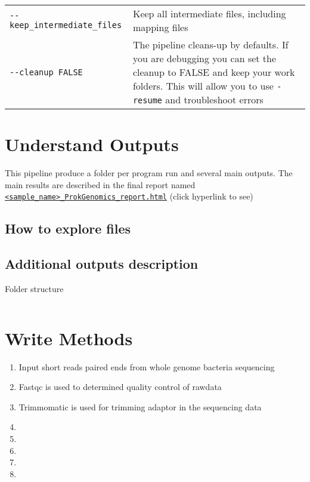 \documentclass[
]{book}
\providecommand{\tightlist}{%
  \setlength{\itemsep}{0pt}\setlength{\parskip}{0pt}}
\begin{document}
\begin{longtable}[]{@{}
  >{\raggedright\arraybackslash}p{}
  >{\raggedright\arraybackslash}p{}@{}}
\texttt{-\/-keep\_intermediate\_files} & Keep all intermediate files, including mapping files \\
\texttt{-\/-cleanup\ FALSE} & The pipeline cleans-up by defaults. If you are debugging you can set the cleanup to FALSE and keep your work folders. This will allow you to use \texttt{-resume} and troubleshoot errors \\
\end{longtable}

\hypertarget{understand-outputs}{%
\chapter{Understand Outputs}\label{understand-outputs}}

This pipeline produce a folder per program run and several main outputs. The main results are described in the final report named \href{https://bioinformatics.erc.monash.edu/home/lper0012/ProkGenomics/1-77321-LFA6246_L2_ProkGenomics_report.html}{\texttt{\textless{}sample\_name\textgreater{}\_ProkGenomics\_report.html}} (click hyperlink to see)

\hypertarget{how-to-explore-files}{%
\section{How to explore files}\label{how-to-explore-files}}

\hypertarget{additional-outputs-description}{%
\section{Additional outputs description}\label{additional-outputs-description}}

Folder structure

\begin{verbatim}
\end{verbatim}

\hypertarget{write-methods}{%
\chapter{Write Methods}\label{write-methods}}

\begin{enumerate}
\def\labelenumi{\arabic{enumi}.}
\tightlist
\item
  Input short reads paired ends from whole genome bacteria sequencing
\item
  Fastqc is used to determined quality control of rawdata
\item
  Trimmomatic is used for trimming adaptor in the sequencing data
\item
\item
\item
\item
\item
\end{enumerate}
\end{document}

